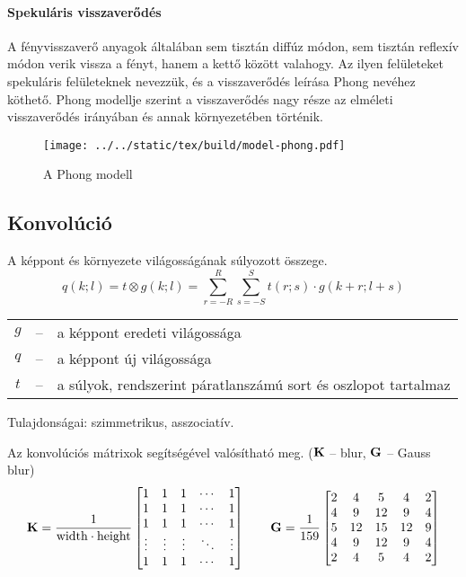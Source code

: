 \documentclass[../../main.tex]{subfiles}
\begin{document}
\paragraph*{Spekuláris visszaverődés}
A fényvisszaverő anyagok általában sem tisztán diffúz módon, sem tisztán
reflexív módon verik vissza a fényt, hanem a kettő között valahogy. Az ilyen
felületeket spekuláris felületeknek nevezzük, és a visszaverődés leírása
Phong nevéhez köthető. Phong modellje szerint a visszaverődés nagy része az
elméleti visszaverődés irányában és annak környezetében történik.
\begin{figure}[H]
  \centering
  \texttt{[image: ../../static/tex/build/model-phong.pdf]}
  \caption{A Phong modell}
  \label{fig:model-phong}
\end{figure}


\subsection{Konvolúció}

A képpont és környezete világosságának súlyozott összege.
\[
  q(k; l)
  = t \otimes g(k; l)
  = \sum_{r=-R}^R \sum_{s=-S}^S t(r; s) \cdot g(k+r; l+s)
\]

\begin{center}
  \begin{tabular}{c c l}
    $g$ & -- & a képpont eredeti világossága
    \\
    $q$ & -- & a képpont új világossága
    \\
    $t$ & -- & a súlyok, rendszerint páratlanszámú sort és oszlopot tartalmaz
  \end{tabular}
\end{center}

Tulajdonságai: szimmetrikus, asszociatív.

Az  konvolúciós mátrixok segítségével valósítható meg.
($\mathbf{K}$ -- blur, $\mathbf{G}$ -- Gauss blur)
\[
  \mathbf{K} = \frac{1}{\mathrm{width} \cdot \mathrm{height}}
  \begin{bmatrix}
    1      & 1      & 1      & \cdots & 1      \\
    1      & 1      & 1      & \cdots & 1      \\
    1      & 1      & 1      & \cdots & 1      \\
    \vdots & \vdots & \vdots & \ddots & \vdots \\
    1      & 1      & 1      & \cdots & 1
  \end{bmatrix}
  \qquad
  \mathbf{G} = \frac{1}{159}
  \begin{bmatrix}
    2 & 4  & 5  & 4  & 2 \\
    4 & 9  & 12 & 9  & 4 \\
    5 & 12 & 15 & 12 & 9 \\
    4 & 9  & 12 & 9  & 4 \\
    2 & 4  & 5  & 4  & 2
  \end{bmatrix}
\]
\end{document}
